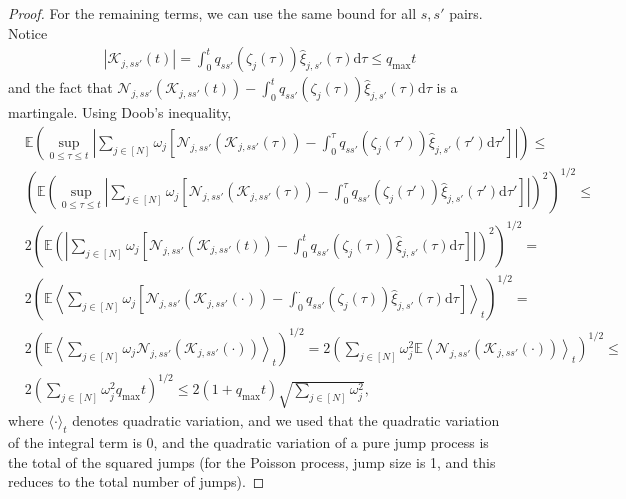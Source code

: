 \documentclass[10pt,a4paper]{amsart}
\newcommand{\E}{\mathbb{E}}
\renewcommand{\d}{\mathrm{d}}
\begin{document}
\begin{proof}
		For the remaining terms, we can use the same bound for all $s,s'$  pairs. Notice
		\begin{align*}
			\left|\mathcal{K}_{j,ss'}(t) \right|=\int_{0}^{t}q_{ss'} \left( \zeta_{j}(\tau)\right) \hat{\xi}_{j,s'}(\tau) \d \tau \leq q_{\textrm{max}}t
		\end{align*}
		and the fact that $\mathcal{N}_{j,ss'}\left(\mathcal{K}_{j,ss'}(t) \right) -\int_{0}^{t}q_{ss'} \left( \zeta_{j}(\tau)\right) \hat{\xi}_{j,s'}(\tau) \d \tau $ is a martingale. Using Doob's inequality,
		\begin{align*}
			&\E \left( \sup_{0 \leq \tau \leq t} \left| \sum_{j \in [N]}\omega_j \left[ \mathcal{N}_{j,ss'}\left(\mathcal{K}_{j,ss'}(\tau) \right) -\int_{0}^{\tau}q_{ss'} \left( \zeta_{j}(\tau')\right) \hat{\xi}_{j,s'}(\tau') \d \tau' \right] \right| \right) \leq \\
			&\left(\E\left( \sup_{0 \leq \tau \leq t} \left| \sum_{j \in [N]}\omega_j \left[ \mathcal{N}_{j,ss'}\left(\mathcal{K}_{j,ss'}(\tau) \right) -\int_{0}^{\tau}q_{ss'} \left( \zeta_{j}(\tau')\right) \hat{\xi}_{j,s'}(\tau') \d \tau' \right] \right|\right)^2   \right)^{1/2}\leq\\
			&2\left(\E\left( \left| \sum_{j \in [N]}\omega_j \left[ \mathcal{N}_{j,ss'}\left(\mathcal{K}_{j,ss'}(t) \right) -\int_{0}^{t}q_{ss'} \left( \zeta_{j}(\tau)\right) \hat{\xi}_{j,s'}(\tau) \d \tau \right] \right|\right)^2 \right)^{1/2}=\\
			& 2\left(\E \left\langle\sum_{j \in [N]}\omega_j \left[ \mathcal{N}_{j,ss'}\left(\mathcal{K}_{j,ss'}(\cdot) \right) -\int_{0}^{\cdot}q_{ss'} \left( \zeta_{j}(\tau)\right) \hat{\xi}_{j,s'}(\tau) \d \tau \right] \right\rangle_{\!\! t}\right)^{1/2}=\\
			& 2\left(\E\left\langle\sum_{j \in [N]}\omega_j \mathcal{N}_{j,ss'}\left(\mathcal{K}_{j,ss'}(\cdot) \right) \right\rangle_{\!\! t}\right)^{1/2}=
			2\left(\sum_{j \in [N]}\omega_j^2 \E\left\langle\mathcal{N}_{j,ss'}\left(\mathcal{K}_{j,ss'}(\cdot) \right) \right\rangle_{t}\right)^{1/2}\leq\\
			& 2\left(\sum_{j \in [N]}\omega_j^2 q_{\max}t\right)^{1/2}\leq
			2(1+ q_{\max}t)\sqrt{\sum_{j \in [N]}\omega_j^2},
		\end{align*}
		where $\langle\cdot\rangle_t$ denotes quadratic variation, and we used that the quadratic variation of the integral term is $0$, and the quadratic variation of a pure jump process is the total of the squared jumps (for the Poisson process, jump size is 1, and this reduces to the total number of jumps).
		

\end{proof}
\end{document}
